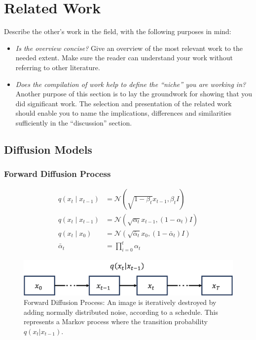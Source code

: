 %
\newpage
\chapter{Related Work}

Describe the other's work in the field, with the following purposes in mind:

\begin{itemize}
    \item \textit{Is the overview concise?} Give an overview of the most relevant work to the needed extent. Make sure the reader can understand your work without referring to other literature.
    \item \textit{Does the compilation of work help to define the ``niche'' you are working in?} Another purpose of this section is to lay the groundwork for showing that you did significant work. The selection and presentation of the related work should enable you to name the implications, differences and similarities sufficiently in the ``discussion'' section.
\end{itemize}

\section{Diffusion Models}
\subsection{Forward Diffusion Process}

\begin{equation}
    \begin{split}
        q(x_t\mid x_{t-1}) & = \mathcal{N}(\sqrt{1-\beta_t} x_{t-1}, \beta_t I) \\
        q(x_t\mid x_{t-1}) & = \mathcal{N}(\sqrt{\alpha_t} x_{t-1}, (1-\alpha_t) I) \\
        q(x_t\mid x_{0}) & = \mathcal{N}(\sqrt{\bar{\alpha}_t} x_{0}, (1 - \bar{\alpha}_t) I) \\
        \bar{\alpha}_t & = \prod_{i=0}^{t} \alpha_t
    \end{split}
\end{equation}

\begin{figure}[h]
    \centering
    \includegraphics[width=.5\textwidth]{images/forward_diffusion.png}
    \caption{Forward Diffusion Process: An image is iteratively destroyed by adding normally distributed noise,
    according to a schedule. This represents a Markov process where the transition probability $q(x_t|x_{t-1})$.}
    \label{fig:forward_diffusion}
\end{figure}

